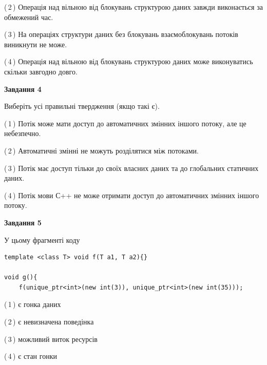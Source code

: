 \documentclass[12pt, ukrainian]{article}
\begin{document}
\begin {large}
{(\,2\,) Операція над вільною від блокувань структурою даних завжди виконається за обмежений час.%

(\,3\,) На операціях структури даних без блокувань взаємоблокувань потоків виникнути не може.%

(\,4\,) Операція над вільною від блокувань структурою даних може виконуватись скільки завгодно довго.%



\begin{center}
\textbf{Завдання 4}
\end{center}
Виберіть усі правильні твердження (якщо такі є).\par
\vspace{2mm}

(\,1\,) Потік може мати доступ до автоматичних змінних іншого потоку, але це небезпечно.%

(\,2\,) Автоматичні змінні не можуть розділятися між потоками.%

(\,3\,) Потік має доступ тільки до своїх власних даних та до глобальних статичних даних.%

(\,4\,) Потік мови С++ не може отримати доступ до автоматичних змінних іншого потоку.%



\begin{center}
\textbf{Завдання 5}
\end{center}
У цьому фрагменті коду
\begin{verbatim}
template <class T> void f(T a1, T a2){}

void g(){
    f(unique_ptr<int>(new int(3)), unique_ptr<int>(new int(35)));
\end{verbatim}

(\,1\,) є гонка даних%

(\,2\,) є невизначена поведінка%

(\,3\,) можливий виток ресурсів%

(\,4\,) є стан гонки%


}
\end {large}
\end{document}
